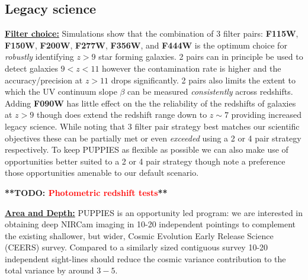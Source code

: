 \documentclass[12pt]{article}
\newcommand{\todo}[1]{\textbf{**TODO: \textcolor{red}{#1}**}}
\begin{document}
\subsection*{Legacy science}







%
%

\clearpage

\justifyobservations   %

\noindent
\underline{\bf Filter choice:} Simulations show that the combination of 3 filter pairs: {\bf F115W}, {\bf F150W}, {\bf F200W}, {\bf F277W}, {\bf F356W}, and {\bf F444W} is the optimum choice for \emph{robustly} identifying $z>9$ star forming galaxies. 2 pairs can in principle be used to detect galaxies $9<z<11$ however the contamination rate is higher and the accuracy/precision at $z>11$ drops significantly. 2 pairs also limits the extent to which the UV continuum slope $\beta$ can be measured \emph{consistently} across redshifts. Adding {\bf F090W} has little effect on the the reliability of the redshifts of galaxies at $z>9$ though does extend the redshift range down to $z\sim 7$ providing increased legacy science. While noting that 3 filter pair strategy best matches our scientific objectives these can be partially met or even \emph{exceeded} using a 2 or 4 pair strategy respectively. To keep PUPPIES as flexible as possible we can also make use of opportunities better suited to a 2 or 4 pair strategy though note a preference those opportunities amenable to our default scenario.

\todo{Photometric redshift tests}

\noindent
\underline{\bf Area and Depth:} PUPPIES is an opportunity led program: we are interested in obtaining deep NIRCam imaging in 10-20 independent pointings to complement the existing shallower, but wider, Cosmic Evolution Early Release Science (CEERS) survey. Compared to a similarly sized contiguous survey 10-20 independent sight-lines should reduce the cosmic variance contribution to the total variance by around $3-5$.
\end{document}
